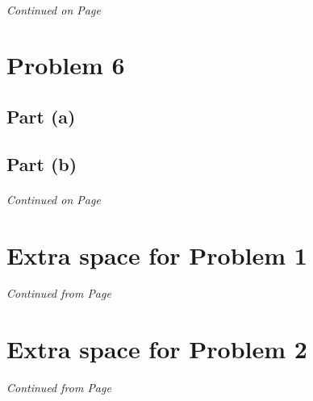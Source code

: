 \documentclass[11pt]{article}
\begin{document}


%
\paragraph{} \emph{Continued on Page \pageref{pg:p5-continuation}}


\newpage


\section*{Problem 6}

\subsection*{Part (a)}
\subsection*{Part (b)}

\label{pg:end-of-p6}

%
\paragraph{} \emph{Continued on Page \pageref{pg:p6-continuation}}


\newpage



\section*{Extra space for Problem 1}
\emph{Continued from Page \pageref{pg:end-of-p1}}\\



\label{pg:p1-continuation}
\newpage


\section*{Extra space for Problem 2}
\emph{Continued from Page \pageref{pg:end-of-p2}}\\
\end{document}

